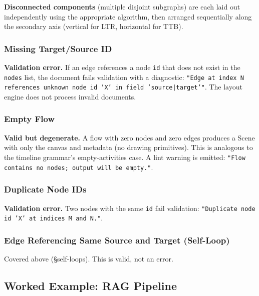 \textbf{Disconnected components} (multiple disjoint subgraphs) are each laid out independently using the appropriate algorithm, then arranged sequentially along the secondary axis (vertical for LTR, horizontal for TTB).

\subsubsection{Missing Target/Source ID}

\textbf{Validation error.} If an edge references a node \texttt{id} that does not exist in the \texttt{nodes} list, the document fails validation with a diagnostic: \texttt{"Edge at index N references unknown node id 'X' in field 'source|target'"}. The layout engine does not process invalid documents.

\subsubsection{Empty Flow}

\textbf{Valid but degenerate.} A flow with zero nodes and zero edges produces a Scene with only the canvas and metadata (no drawing primitives). This is analogous to the timeline grammar's empty-activities case. A lint warning is emitted: \texttt{"Flow contains no nodes; output will be empty."}.

\subsubsection{Duplicate Node IDs}

\textbf{Validation error.} Two nodes with the same \texttt{id} fail validation: \texttt{"Duplicate node id 'X' at indices M and N."}.

\subsubsection{Edge Referencing Same Source and Target (Self-Loop)}

Covered above (\S self-loops). This is valid, not an error.

\subsection{Worked Example: RAG Pipeline}
\label{sec:flow-worked-example}

